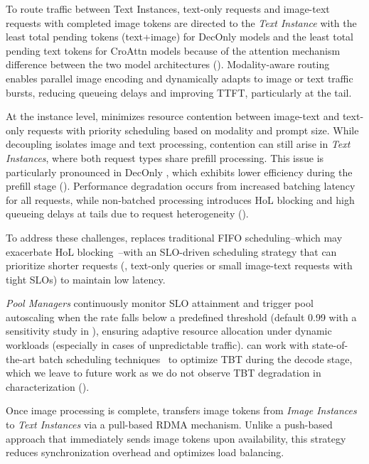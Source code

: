 To route traffic between Text Instances, text-only requests and image-text requests with completed image tokens are directed to the \emph{Text Instance} with the least total pending tokens (text+image) for DecOnly models and the least total pending text tokens for CroAttn models because of the attention mechanism difference between the two model architectures ().
Modality-aware routing enables parallel image encoding and dynamically adapts to image or text traffic bursts, reducing queueing delays and improving TTFT, particularly at the tail.

At the instance level, \sysname{} minimizes resource contention between image-text and text-only requests with priority scheduling based on modality and prompt size.
While decoupling isolates image and text processing, contention can still arise in \emph{Text Instances}, where both request types share prefill processing.
This issue is particularly pronounced in DecOnly \lmms{}, which exhibits lower efficiency during the prefill stage ().
Performance degradation occurs from increased batching latency for all requests, while non-batched processing introduces HoL blocking and high queueing delays at tails due to request heterogeneity ().

To address these challenges, \sysname{} replaces traditional FIFO scheduling--which may exacerbate HoL blocking~\cite{patke2024queue,aiops2024qiu}--with an SLO-driven scheduling strategy that can prioritize shorter requests (\eg{}, text-only queries or small image-text requests with tight SLOs) to maintain low latency.

\emph{Pool Managers} continuously monitor SLO attainment and trigger pool autoscaling when the rate falls below a predefined threshold (default 0.99 with a sensitivity study in ), ensuring adaptive resource allocation under dynamic workloads (especially in cases of unpredictable traffic).
\sysname{} can work with state-of-the-art batch scheduling techniques~\cite{sarathi-serve,patel2024splitwise} to optimize TBT during the decode stage, which we leave to future work as we do not observe TBT degradation in \lmm{} characterization ().

Once image processing is complete, \sysname{} transfers image tokens from \emph{Image Instances} to \emph{Text Instances} via a pull-based RDMA mechanism.
Unlike a push-based approach that immediately sends image tokens upon availability, this strategy reduces synchronization overhead and optimizes load balancing.

